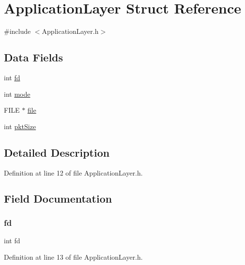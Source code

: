 \hypertarget{struct_application_layer}{}\section{Application\+Layer Struct Reference}
\label{struct_application_layer}


{\ttfamily \#include $<$Application\+Layer.\+h$>$}

\subsection*{Data Fields}
\begin{DoxyCompactItemize}
\item 
int \hyperlink{struct_application_layer_a6f8059414f0228f0256115e024eeed4b}{fd}
\item 
int \hyperlink{struct_application_layer_a1ea5d0cb93f22f7d0fdf804bd68c3326}{mode}
\item 
F\+I\+LE $\ast$ \hyperlink{struct_application_layer_a702945180aa732857b380a007a7e2a21}{file}
\item 
int \hyperlink{struct_application_layer_a84ec7b711a9ead8ee3f585398d7b6df6}{pkt\+Size}
\end{DoxyCompactItemize}


\subsection{Detailed Description}


Definition at line 12 of file Application\+Layer.\+h.



\subsection{Field Documentation}
\hypertarget{struct_application_layer_a6f8059414f0228f0256115e024eeed4b}{}\label{struct_application_layer_a6f8059414f0228f0256115e024eeed4b} 
\subsubsection{\texorpdfstring{fd}{fd}}
{\footnotesize\ttfamily int fd}



Definition at line 13 of file Application\+Layer.\+h.

\hypertarget{struct_application_layer_a702945180aa732857b380a007a7e2a21}{}\label{struct_application_layer_a702945180aa732857b380a007a7e2a21} 

